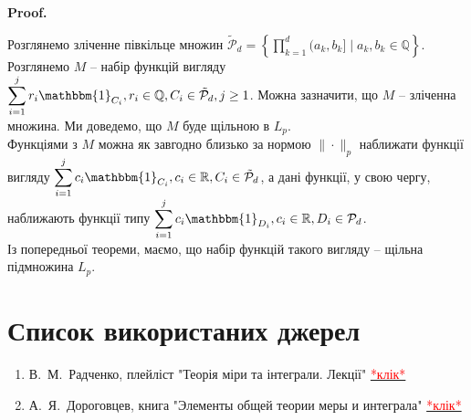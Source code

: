 \documentclass[a4paper, 10pt]{article}
\makeatletter
\theoremstyle{theoremdd}
\renewenvironment{proof}[1][Proof.\\]{\par
\pushQED{\hfill \qed}%
\normalfont \topsep6\p@\@plus6\p@\relax
\trivlist
\item\relax
{\bfseries
#1\@addpunct{.}}\hspace\labelsep\ignorespaces
}{%
\popQED\endtrivlist\@endpefalse
}
\makeatother
\begin{document}
\begin{proof}
Розглянемо зліченне півкільце множин $\displaystyle \tilde{\mathcal{P}}_d = \left\{ \prod_{k=1}^d (a_k,b_k] \mid a_k,b_k \in \mathbb{Q} \right\}$. Розглянемо $M$ -- набір функцій вигляду $\displaystyle\sum_{i=1}^j r_i \mathbbm{1}_{C_i}, r_i \in \mathbb{Q}, C_i \in \tilde{\mathcal{P}}_d, j \geq 1$. Можна зазначити, що $M$ -- зліченна множина. Ми доведемо, що $M$ буде щільною в $L_p$.\\
Функціями з $M$ можна як завгодно близько за нормою $\| \cdot \|_p$ наближати функції вигляду $\displaystyle\sum_{i=1}^j c_i \mathbbm{1}_{C_i}, c_i \in \mathbb{R}, C_i \in \tilde{\mathcal{P}}_d$, а дані функції, у свою чергу, наближають функції типу $\displaystyle\sum_{i=1}^j c_i \mathbbm{1}_{D_i}, c_i \in \mathbb{R}, D_i \in \mathcal{P}_d$.\\
Із попередньої теореми, маємо, що набір функцій такого вигляду -- щільна підмножина $L_p$.
\end{proof}
\newpage

\newpage
\thispagestyle{empty}
\section*{Список використаних джерел}
\begin{enumerate}[wide=0pt]
\item В.\ М.\ Радченко, плейліст "Теорія міри та інтеграли. Лекції" \quad \href{https://www.youtube.com/@vadymradchenko8925/playlists}{\textcolor{red}{*клік*}}
\item А.\ Я.\ Дороговцев, книга "Элементы общей теории меры и интеграла" \quad \href{https://www.slideshare.net/YuriyMaturin/ss-58815473}{\textcolor{red}{*клік*}}
\end{enumerate}
\end{document}
